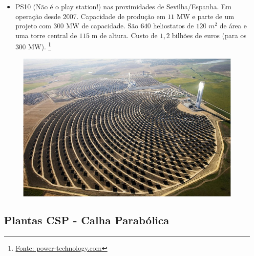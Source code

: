 \documentclass[12pt,notheorems,hyperref={pdfauthor=Professor Rafael Nardi}]{beamer}
\begin{document}
\begin{frame}%

	\begin{itemize} 
		\item PS10 (Não é o play station!) nas proximidades de Sevilha/Espanha. Em operação desde 2007.
			Capacidade de produção em $11$ MW e parte de um projeto com
			$300$ MW de capacidade. São $640$ heliostatos de $120$ $m^2$ de área e uma torre central de $115$ m de altura.
			Custo de $1,2$ bilhões de euros (para os $300$ MW). \footnote{\href{https://www.power-technology.com/projects/seville-solar-tower/}{Fonte: power-technology.com}}
	\end{itemize}

	\begin{figure}
		\centering
		\includegraphics[scale=0.3]{./seville-solar-plant-10[6].jpg}
	\end{figure}

\end{frame}

\subsection{Plantas CSP - Calha Parabólica}
\end{document}
